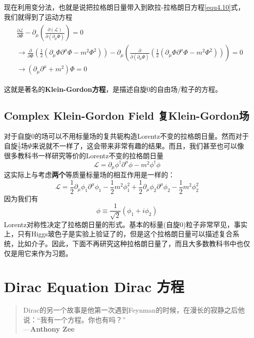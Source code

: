 现在利用变分法，也就是说把拉格朗日量带入到欧拉-拉格朗日方程\eqref{equ4.10}式，我们就得到了运动方程
\begin{align}
\label{equ6.5}
\begin{split}
&\frac{\partial\mathscr{L}}{\partial\Phi}-\partial_\mu\left(\frac{\partial(\mathscr{L})}{\partial(\partial_\mu\Phi)}\right)=0\\
&\rightarrow\frac{\partial}{\partial\Phi}\left(\frac{1}{2}(\partial_\mu\Phi\partial^\mu\Phi-m^2\Phi^2)\right)-\partial_\mu\left(\frac{\partial}{\partial(\partial_\mu\Phi)}\left(\frac{1}{2}(\partial_\mu\Phi\partial^\mu\Phi-m^2\Phi^2)\right)\right)=0 \\
&\rightarrow(\partial_\mu\partial^\mu+m^2)\Phi=0
\end{split}
\end{align}

这就是著名的{\bf Klein-Gordon方程}，是描述自旋$0$的自由场/粒子的方程。

\subsection[复Klein-Gordon场]{Complex Klein-Gordon Field \quad 复Klein-Gordon场}\label{sec6.2.1}

对于自旋$0$的场可以不用标量场的复共轭构造Lorentz不变的拉格朗日量。然而对于自旋$\frac{1}{2}$场$\Psi$来说就不一样了，这会带来非常有趣的结果。而且，我们甚至也可以像很多教科书一样研究等价的Lorentz不变的拉格朗日量
\[\mathscr{L}=\partial_\mu\phi^\dagger\partial^\mu\phi-m^2\phi^\dagger\phi \]
这实际上与考虑{\bf 两个}等质量标量场的相互作用是一样的：
\[\mathscr{L}=\frac{1}{2}\partial_\mu\phi_1\partial^\mu\phi_1-\frac{1}{2}m^2\phi_1^2+\frac{1}{2}\partial_\mu\phi_2\partial^\mu\phi_2-\frac{1}{2}m^2\phi_2^2 \]
因为我们有
\[\phi\equiv\frac{1}{\sqrt2}(\phi_1+i\phi_2) \]
Lorentz对称性决定了拉格朗日量的形式。基本的标量(自旋$0$)粒子非常罕见，事实上，只有Higgs玻色子是实验上验证了的，但是这个拉格朗日量可以描述复合系统，比如介子。因此，下面不再研究这种拉格朗日量了，而且大多数教科书中也仅仅是用它来作为习题。

\section[Dirac方程]{Dirac Equation \quad Dirac 方程}\label{sec6.3}
\begin{quote}
Dirac的另一个故事是他第一次遇到Feynman的时候，在漫长的寂静之后他说：“我有一个方程。你也有吗？”\\
\phantom{Dirac的另一个故事是他第一次遇到}---{\bf Anthony Zee}
\end{quote}

